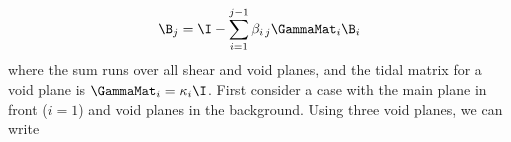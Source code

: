 \begin{equation}
\label{eq:Bold}
  \B_j = \I - \sum_{i=1}^{j-1} \beta_{i\,j} \GammaMat_i \B_i
\end{equation}
where the sum runs over all shear and void planes, and the tidal matrix for a void plane is $\GammaMat_i = \kappa_i \I$.  First consider a case with the main plane in front ($i=1$) and void planes in the background.  Using three void planes, we can write
  
